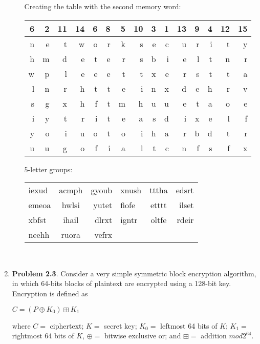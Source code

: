 \documentclass[12pt]{article}
\begin{document}
\begin{enumerate}
\begin{enumerate}
Creating the table with the second memory word: \\
\begin{center}
  \begin{tabular}{ | r | r | r | r | r | r | r | r | r | r | r | r | r | r | r |}
    \hline
   \rowcolor{lightgray}  6&2&11&14&6&8&5&10&3&1&13&9&4&12&15\\ \hline
    \rowcolor{maroon!10}n&e&t&w&o&r&k&s&e&c&u&r&i&t&y\\ \hline
    h&m&d&e&t&e&r&s&b&i&e&l&t&n&r\\ \hline
    w&p&l&e&e & e&t&t&x&e & r&s&t&t&a\\ \hline
     l&n&r&h&t & t&e&i&n&x & d&e&h&r&v\\ \hline
    s&g&x&h&f & t&m&h&u&u & e&t&a&o&e \\ \hline
    i&y&t&r&i & t&e&a&s&d & i&x&e&l&f\\ \hline
    y&o&i&u&o & t&o&i&h&a & r&b&d&t&r \\ \hline
    u&u&g&o&f&  i&a&l&t&c & n&f&s&f&x\\ \hline
        \hline
  \end{tabular}
\end{center}


5-letter groups:\\

\begin{tabular}{ l c r l c r }
  iexud & acmph & gyoub & xnush & tttha & edsrt \\
  emeoa & hwlsi & yutet & fiofe & etttt & ilset \\
  xbfst & ihail & dlrxt & igntr & oltfe & rdeir \\
  neehh & ruora & vefrx 
\end{tabular} \\

				
	\end{enumerate}
	\vspace{10pt}
	
	
	\item {\textbf{Problem 2.3}. Consider a very simple symmetric block encryption algorithm, in which 64-bits blocks of plaintext are encrypted using a 128-bit key. Encryption is defined as  \begin{center} $ C = (P \oplus K_0 ) \boxplus K_1$ \end{center}  where $C=$ ciphertext; $K=$ secret key; $K_0 =$ leftmost 64 bits of $K$; $K_1=$ rightmost  64 bits of $K$, $\oplus =$ bitwise exclusive or; and $\boxplus = $ addition $mod 2^{64}$.}
	

\end{enumerate}
\end{document}
